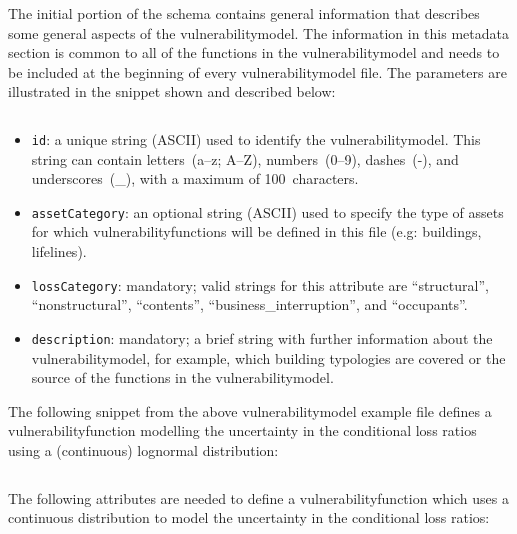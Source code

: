 The initial portion of the schema contains general information that describes
some general aspects of the \gls{vulnerabilitymodel}. The information in this
metadata section is common to all of the functions in the
\gls{vulnerabilitymodel} and needs to be included at the beginning of every
\gls{vulnerabilitymodel} file. The parameters are illustrated in the snippet
shown and described below:

\inputminted[firstline=4,firstnumber=4,lastline=8,fontsize=\footnotesize,frame=single,linenos,bgcolor=lightgray]{xml}{oqum/risk/Verbatim/input_vulnerability.xml}

\begin{itemize}

  \item \Verb+id+: a unique string (ASCII) used to identify the
    \gls{vulnerabilitymodel}. This string can contain letters~(a--z; A--Z),
    numbers~(0--9), dashes~(-), and underscores~(\_), with a maximum of
    100~characters.

  \item \Verb+assetCategory+: an optional string (ASCII) used to specify the
    type of \glspl{asset} for which \glspl{vulnerabilityfunction} will be 
    defined in this file (e.g: buildings, lifelines).

  \item \Verb+lossCategory+: mandatory; valid strings for this attribute are 
    ``structural'', ``nonstructural'', ``contents'',  
    ``business\_interruption'', and ``occupants''.

  \item \Verb+description+: mandatory; a brief string with further information about the
    \gls{vulnerabilitymodel}, for example, which building typologies are 
    covered or the source of the functions in the \gls{vulnerabilitymodel}.

\end{itemize}


The following snippet from the above \gls{vulnerabilitymodel} example file defines
a \gls{vulnerabilityfunction} modelling the uncertainty in the conditional loss
ratios using a (continuous) lognormal distribution:

\inputminted[firstline=10,firstnumber=10,lastline=14,fontsize=\footnotesize,frame=single,linenos,bgcolor=lightgray]{xml}{oqum/risk/Verbatim/input_vulnerability.xml}

The following attributes are needed to define a \gls{vulnerabilityfunction} which
uses a continuous distribution to model the uncertainty in the conditional
loss ratios:

